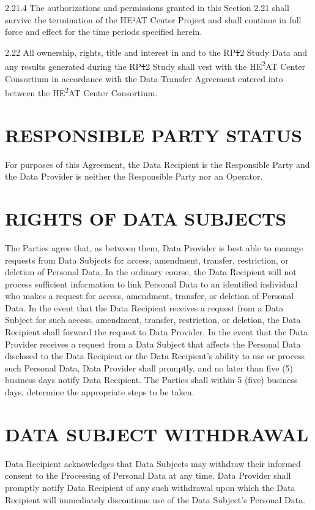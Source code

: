 \documentclass[12pt,letterpaper]{article}
\newcommand{\deleted}[1]{\textcolor{deletecolor}{\sout{#1}}}
\newcommand{\added}[1]{\textcolor{addcolor}{#1}}
\begin{document}
\added{2.21.4 The authorizations and permissions granted in this Section 2.21 shall survive the termination of the HE²AT Center Project and shall continue in full force and effect for the time periods specified herein.}

2.22 All ownership, rights, title and interest in and to the RP\deleted{1}\added{2} Study Data and any results generated during the RP\deleted{1}\added{2} Study shall vest with the HE\textsuperscript{2}AT Center Consortium in accordance with the Data Transfer Agreement entered into between the HE\textsuperscript{2}AT Center Consortium.

\section{RESPONSIBLE PARTY STATUS}

For purposes of this Agreement, the Data Recipient is the Responsible Party and the Data Provider is neither the Responsible Party nor an Operator.

\section{RIGHTS OF DATA SUBJECTS}

The Parties agree that, as between them, Data Provider is best able to manage requests from Data Subjects for access, amendment, transfer, restriction, or deletion of Personal Data. In the ordinary course, the Data Recipient will not process sufficient information to link Personal Data to an identified individual who makes a request for access, amendment, transfer, or deletion of Personal Data. In the event that the Data Recipient receives a request from a Data Subject for such access, amendment, transfer, restriction, or deletion, the Data Recipient shall forward the request to Data Provider. In the event that the Data Provider receives a request from a Data Subject that affects the Personal Data disclosed to the Data Recipient or the Data Recipient's ability to use or process such Personal Data, Data Provider shall promptly, and no later than five (5) business days notify Data Recipient. The Parties shall within 5 (five) business days, determine the appropriate steps to be taken.

\section{DATA SUBJECT WITHDRAWAL}

Data Recipient acknowledges that Data Subjects may withdraw their informed consent to the Processing of Personal Data at any time. Data Provider shall promptly notify Data Recipient of any such withdrawal upon which the Data Recipient will immediately discontinue use of the Data Subject's Personal Data.
\end{document}
